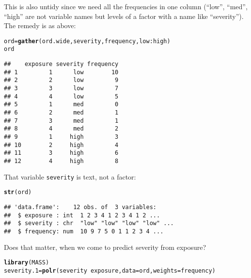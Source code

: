 \documentclass{article}\usepackage[]{graphicx}\usepackage[]{color}
\makeatletter
\newcommand{\hlopt}[1]{\textcolor[rgb]{0,0,0}{#1}}%
\newcommand{\hlstd}[1]{\textcolor[rgb]{0.345,0.345,0.345}{#1}}%
\newcommand{\hlkwb}[1]{\textcolor[rgb]{0.69,0.353,0.396}{#1}}%
\newcommand{\hlkwc}[1]{\textcolor[rgb]{0.333,0.667,0.333}{#1}}%
\newcommand{\hlkwd}[1]{\textcolor[rgb]{0.737,0.353,0.396}{\textbf{#1}}}%
\newenvironment{kframe}{%
 \def\at@end@of@kframe{}%
 \ifinner\ifhmode%
  \def\at@end@of@kframe{\end{minipage}}%
  \begin{minipage}{\columnwidth}%
 \fi\fi%
 \def\FrameCommand##1{\hskip\@totalleftmargin \hskip-\fboxsep
 \colorbox{shadecolor}{##1}\hskip-\fboxsep
     \hskip-\linewidth \hskip-\@totalleftmargin \hskip\columnwidth}%
 \MakeFramed {\advance\hsize-\width
   \@totalleftmargin\z@ \linewidth\hsize
   \@setminipage}}%
 {\par\unskip\endMakeFramed%
 \at@end@of@kframe}
\newenvironment{knitrout}{}{} %
\makeatother
\begin{document}
This is also untidy since we need all the frequencies in one column
(``low'', ``med'', ``high'' are not variable names but levels of a
factor with a name like ``severity''). The remedy is as above:

\begin{knitrout}
\color{fgcolor}\begin{kframe}
\begin{alltt}
\hlstd{ord}\hlkwb{=}\hlkwd{gather}\hlstd{(ord.wide,severity,frequency,low}\hlopt{:}\hlstd{high)}
\hlstd{ord}
\end{alltt}
\begin{verbatim}
##    exposure severity frequency
## 1         1      low        10
## 2         2      low         9
## 3         3      low         7
## 4         4      low         5
## 5         1      med         0
## 6         2      med         1
## 7         3      med         1
## 8         4      med         2
## 9         1     high         3
## 10        2     high         4
## 11        3     high         6
## 12        4     high         8
\end{verbatim}
\end{kframe}
\end{knitrout}

That variable \texttt{severity} is text, not a factor:

\begin{knitrout}
\color{fgcolor}\begin{kframe}
\begin{alltt}
\hlkwd{str}\hlstd{(ord)}
\end{alltt}
\begin{verbatim}
## 'data.frame':	12 obs. of  3 variables:
##  $ exposure : int  1 2 3 4 1 2 3 4 1 2 ...
##  $ severity : chr  "low" "low" "low" "low" ...
##  $ frequency: num  10 9 7 5 0 1 1 2 3 4 ...
\end{verbatim}
\end{kframe}
\end{knitrout}

Does that matter, when we come to predict severity from exposure?

\begin{knitrout}
\color{fgcolor}\begin{kframe}
\begin{alltt}
\hlkwd{library}\hlstd{(MASS)}
\hlstd{severity.1}\hlkwb{=}\hlkwd{polr}\hlstd{(severity}\hlopt{~}\hlstd{exposure,}\hlkwc{data}\hlstd{=ord,}\hlkwc{weights}\hlstd{=frequency)}
\end{alltt}


{\ttfamily\noindent\bfseries{}}\end{kframe}
\end{knitrout}
\end{document}
